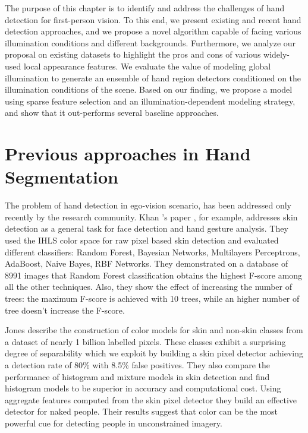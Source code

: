 The purpose of this chapter is to identify and address the
challenges of hand detection for first-person vision. To this
end, we present existing and recent hand detection approaches, and we propose a novel algorithm capable of facing
various illumination conditions and different backgrounds. Furthermore, we analyze our proposal on existing datasets to highlight the pros and cons of various widely-used local appearance features. We
evaluate the value of modeling global illumination to generate
an ensemble of hand region detectors conditioned on the
illumination conditions of the scene. Based on our finding,
we propose a model using sparse feature selection and an
illumination-dependent modeling strategy, and show that it
out-performs several baseline approaches.

\section{Previous approaches in Hand Segmentation}
The problem of hand detection  in ego-vision scenario, has been addressed only recently by the research community. Khan \etal's paper \cite{khan10}, for example, addresses skin detection as a general task for face detection and hand gesture analysis. They used the IHLS color space for raw pixel based skin detection and evaluated different classifiers: Random Forest, Bayesian Networks, Multilayers Perceptrons, AdaBoost, Naive Bayes, RBF Networks. They demonstrated on a database of 8991 images that Random Forest classification obtains the highest F-score among all the other techniques. Also, they show the effect of increasing the number of trees: the maximum F-score is achieved with 10 trees, while an higher number of tree doesn't increase the F-score.

Jones \etal \cite{jones99} describe the construction of color models for skin and non-skin classes from a dataset of nearly 1 billion labelled pixels. These classes exhibit a surprising degree of separability which we exploit by building a skin pixel detector achieving a detection rate of 80\% with 8.5\% false positives. They also compare the performance of histogram and mixture models in skin detection and find histogram models to be superior in accuracy and computational cost. Using aggregate features computed from the
skin pixel detector they build an effective detector for naked people. Their results suggest that color can be the most powerful cue for detecting people in unconstrained imagery.

